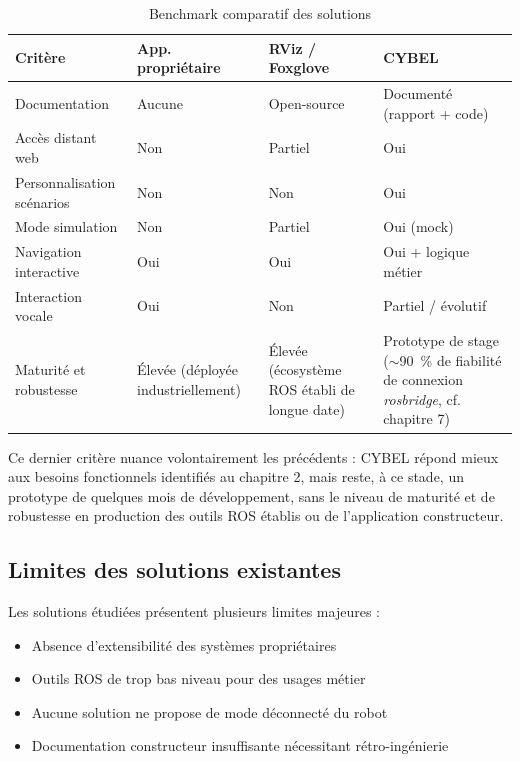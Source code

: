 \begin{table}[H]
\centering
\begin{tabular}{|p{}|p{}|p{}|p{}|}
\hline
\textbf{Critère} &
\textbf{App. propriétaire} &
\textbf{RViz / Foxglove} &
\textbf{CYBEL} \\
\hline
Documentation &
Aucune &
Open-source &
Documenté (rapport + code) \\
\hline
Accès distant web &
Non &
Partiel &
Oui \\
\hline
Personnalisation scénarios &
Non &
Non &
Oui \\
\hline
Mode simulation &
Non &
Partiel &
Oui (mock) \\
\hline
Navigation interactive &
Oui &
Oui &
Oui + logique métier \\
\hline
Interaction vocale &
Oui &
Non &
Partiel / évolutif \\
\hline
Maturité et robustesse &
Élevée (déployée industriellement) &
Élevée (écosystème ROS établi de longue date) &
Prototype de stage ($\sim$90~\% de fiabilité de connexion \textit{rosbridge}, cf. chapitre 7) \\
\hline
\end{tabular}
\caption{Benchmark comparatif des solutions}
\label{tab:benchmark_cybel}
\end{table}

Ce dernier critère nuance volontairement les précédents : CYBEL répond mieux
aux besoins fonctionnels identifiés au chapitre 2, mais reste, à ce stade,
un prototype de quelques mois de développement, sans le niveau de maturité
et de robustesse en production des outils ROS établis ou de l'application
constructeur.

\subsection{Limites des solutions existantes}
\label{subsec:limites}

Les solutions étudiées présentent plusieurs limites majeures :

\begin{itemize}
    \item Absence d'extensibilité des systèmes propriétaires
    \item Outils ROS de trop bas niveau pour des usages métier
    \item Aucune solution ne propose de mode déconnecté du robot
    \item Documentation constructeur insuffisante nécessitant rétro-ingénierie
\end{itemize}

